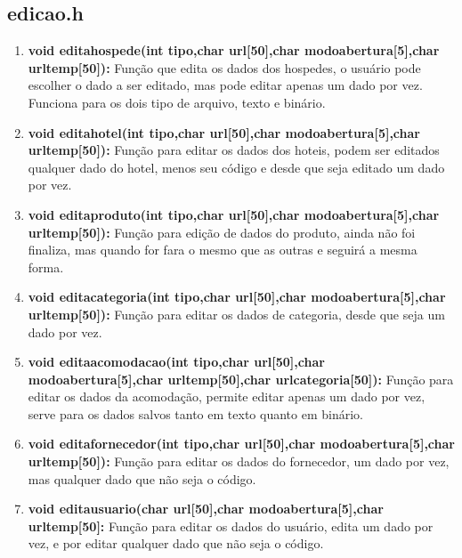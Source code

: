 \documentclass{article}
\begin{document}
\subsection{edicao.h}
\begin{enumerate}
	\item \textbf{void editahospede(int tipo,char url[50],char modoabertura[5],char urltemp[50]): }Função que edita os dados dos hospedes, o usuário pode escolher o dado a ser editado, mas pode editar apenas um dado por vez. Funciona para os dois tipo de arquivo, texto e binário.
	\item \textbf{void editahotel(int tipo,char url[50],char modoabertura[5],char urltemp[50]): }Função para editar os dados dos hoteis, podem ser editados qualquer dado do hotel, menos seu código e desde que seja editado um dado por vez.\\
	\item \textbf{void editaproduto(int tipo,char url[50],char modoabertura[5],char urltemp[50]): }Função para edição de dados do produto, ainda não foi finaliza, mas quando for fara o mesmo que as outras e seguirá a mesma forma.\\
	\item \textbf{void editacategoria(int tipo,char url[50],char modoabertura[5],char urltemp[50]): }Função para editar os dados de categoria, desde que seja um dado por vez.\\
	\item \textbf{void editaacomodacao(int tipo,char url[50],char modoabertura[5],char urltemp[50],char urlcategoria[50]): }Função para editar os dados da acomodação, permite editar apenas um dado por vez, serve para os dados salvos tanto em texto quanto em binário.\\
	\item \textbf{void editafornecedor(int tipo,char url[50],char modoabertura[5],char urltemp[50]): }Função para editar os dados do fornecedor, um dado por vez, mas qualquer dado que não seja o código. \\
	\item \textbf{void editausuario(char url[50],char modoabertura[5],char urltemp[50]: }Função para editar os dados do usuário, edita um dado por vez, e por editar qualquer dado que não seja o código.\\
\end{enumerate}
\end{document}
